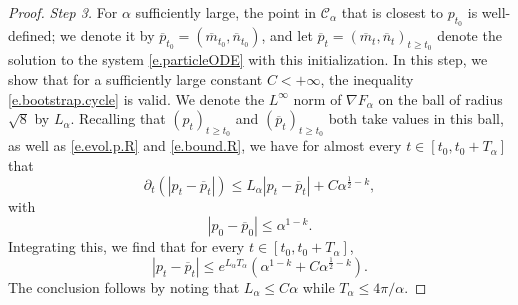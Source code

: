 \documentclass[11pt]{amsart}
\theoremstyle{remark}
\theoremstyle{definition}
\numberwithin{equation}{section}
\numberwithin{proposition}{section}
\renewcommand{\le}{\leqslant}
\renewcommand{\ge}{\geqslant}
\renewcommand{\bar}{\overline}
\newcommand{\Ll}{\left}
\newcommand{\Rr}{\right}
\newcommand{\dr}{\partial}
\newcommand{\1}{\mathbf{1}}
\newcommand{\msc}{\mathscr}
\newcommand{\al}{\alpha}
\begin{document}
\begin{proof}
\medskip


\noindent \emph{Step 3.} For $\alpha$ sufficiently large, the point in $\msc C_\al$ that is closest to $p_{t_0}$ is well-defined; we denote it by $\bar p_{t_0} = (\bar m_{t_0}, \bar n_{t_0})$, and let $\bar p_t = (\bar m_t, \bar n_t)_{t \ge t_0}$ denote the solution to the system \eqref{e.particleODE} with this initialization. In this step, we show that for a sufficiently large constant $C < +\infty$, the inequality \eqref{e.bootstrap.cycle} is valid. We denote the $L^\infty$ norm of $\nabla F_\al$ on the ball of radius $\sqrt{8}$ by $L_\al$. Recalling that $(p_t)_{t \ge t_0}$ and $(\bar p_t)_{t \ge t_0}$ both take values in this ball, as well as \eqref{e.evol.p.R} and \eqref{e.bound.R}, we have for almost every $t \in [t_0, t_0 + T_\al]$ that
\begin{equation*}  %
\dr_t \Ll(|p_t - \bar p_t|\Rr) \le L_\al |p_t - \bar p_t| + C \al^{\frac 1 2 - k},
\end{equation*}
with
\begin{equation*}  %
|p_0 -\bar p_0| \le \al^{1-k}.
\end{equation*}
Integrating this, we find that for every $t \in [t_0, t_0 + T_\al]$,
\begin{equation*}  %
|p_t -\bar p_t| \le e^{L_\al T_\al} \Ll(\al^{1-k} + C \al^{\frac 1 2 - k}\Rr) .
\end{equation*}
The conclusion follows by noting that $L_\al \le C \al$ while $T_\al \le 4\pi/\al$. 


\medskip


\end{proof}
\end{document}
